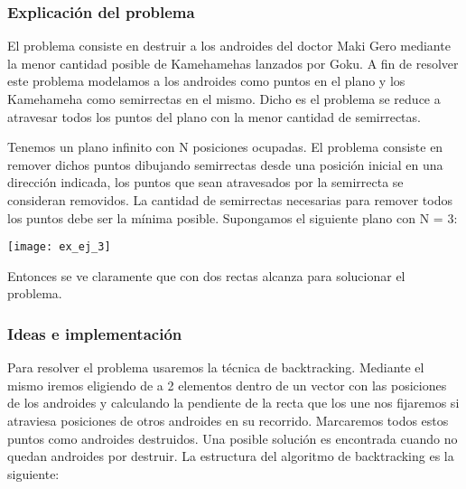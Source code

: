 \subsubsection{Explicación del problema}
El problema consiste en destruir a los androides del doctor Maki Gero mediante la menor cantidad posible de Kamehamehas lanzados por Goku.
A fin de resolver este problema modelamos a los androides como puntos en el plano y los Kamehameha como semirrectas en el mismo. Dicho es el problema se reduce a atravesar todos los puntos del plano con la menor cantidad de semirrectas.

Tenemos un plano infinito con N posiciones ocupadas. El problema consiste en remover dichos puntos dibujando semirrectas desde una posición inicial en una dirección indicada, los puntos que sean atravesados por la semirrecta se consideran removidos. La cantidad de semirrectas necesarias para remover todos los puntos debe ser la mínima posible.
Supongamos el siguiente plano con N = 3:

\texttt{[image: ex\_ej\_3]}


Entonces se ve claramente que con dos rectas alcanza para solucionar el problema.






\subsubsection{Ideas e implementación}
Para resolver el problema usaremos la técnica de backtracking. Mediante el mismo iremos eligiendo de a 2 elementos dentro de un vector con las posiciones de los androides y calculando la pendiente de la recta que los une nos fijaremos si atraviesa posiciones de otros androides en su recorrido. Marcaremos todos estos puntos como androides destruidos.
Una posible solución es encontrada cuando no quedan androides por destruir.
La estructura del algoritmo de backtracking es la siguiente:

%



